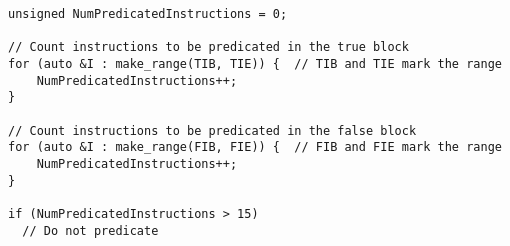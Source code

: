 \begin{lstlisting}[style=CStyle]
unsigned NumPredicatedInstructions = 0;

// Count instructions to be predicated in the true block
for (auto &I : make_range(TIB, TIE)) {  // TIB and TIE mark the range
    NumPredicatedInstructions++;
}

// Count instructions to be predicated in the false block
for (auto &I : make_range(FIB, FIE)) {  // FIB and FIE mark the range
    NumPredicatedInstructions++;
}

if (NumPredicatedInstructions > 15)
  // Do not predicate
\end{lstlisting}